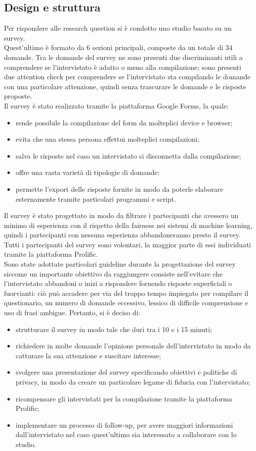 \subsection{Design e struttura}
Per rispondere alle research question si è condotto uno studio basato su un survey.\\
Quest'ultimo è formato da 6 sezioni principali, composte da un totale di 34 domande. Tra le domande del survey ne sono presenti due discriminanti utili a comprendere se l'intervistato è adatto o meno alla compilazione; sono presenti due attention check per comprendere se l'intervistato sta compilando le domande con una particolare attenzione, quindi senza trascurare le domande e le risposte proposte.\\
Il survey è stato realizzato tramite la piattaforma Google Forms, la quale:
\begin{itemize}
    \item rende possibile la compilazione del form da molteplici device e browser;
    \item evita che una stessa persona effettui molteplici compilazioni;
    \item salva le risposte nel caso un intervistato si disconnetta dalla compilazione;
    \item offre una vasta varietà di tipologie di domande;
    \item permette l'export delle risposte fornite in modo da poterle elaborare esternamente tramite particolari programmi e script.
\end{itemize}
Il survey è stato progettato in modo da filtrare i partecipanti che avessero un minimo di esperienza con il rispetto della fairness nei sistemi di machine learning, quindi i partecipanti con nessuna esperienza abbandoneranno presto il survey. Tutti i partecipanti del survey sono volontari, la maggior parte di essi individuati tramite la piattaforma Prolific.\\
Sono state adottate particolari guideline durante la progettazione del survey siccome un importante obiettivo da raggiungere consiste nell'evitare che l'intervistato abbandoni o inizi a rispondere fornendo risposte superficiali o fuorvianti: ciò può accadere per via del troppo tempo impiegato per compilare il questionario, un numero di domande eccessivo, lessico di difficile comprensione e uso di frasi ambigue. Pertanto, si è deciso di:
\begin{itemize}
    \item strutturare il survey in modo tale che duri tra i 10 e i 15 minuti;
    \item richiedere in molte domande l'opinione personale dell'intervistato in modo da catturare la sua attenzione e suscitare interesse;
    \item svolgere una presentazione del survey specificando obiettivi e politiche di privacy, in modo da creare un particolare legame di fiducia con l'intervistato;
    \item ricompensare gli intervistati per la compilazione tramite la piattaforma Prolific;
    \item implementare un processo di follow-up, per avere maggiori informazioni dall'intervistato nel caso quest'ultimo sia interessato a collaborare con lo studio.
\end{itemize}
